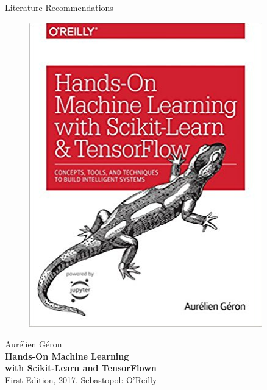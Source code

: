 \documentclass[main.tex]{subfiles}
\begin{document}
\begin{frame}{Literature Recommendations}
        \begin{minipage}{0.1\textwidth}
            \begin{figure}[H]
                \includegraphics[height=0.2\textheight, width=0.9\textwidth, left]{assets/book-covers/geron2017.jpg}
            \end{figure}
        \end{minipage}
        \begin{minipage}{0.32\textwidth}
            \footnotesize Aurélien Géron \normalsize \\[-0.5mm]
            \small \textbf{Hands-On Machine Learning} \\[-0.8mm]
            \textbf{with Scikit-Learn and TensorFlown} \normalsize \\
            \tiny First Edition, 2017, Sebastopol: O'Reilly \normalsize
        \end{minipage}
        \begin{minipage}{0.1\textwidth}
            \begin{figure}[H]

\end{figure}
\end{minipage}
\end{frame}
\end{document}
